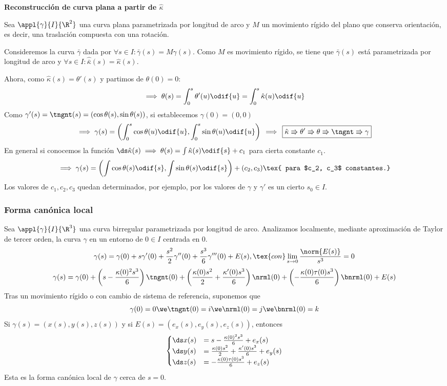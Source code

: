 \textbf{Reconstrucción de curva plana a partir de $\hat{\kappa}$}

Sea $\appl{\gamma}{I}{\R^2}$ una curva plana parametrizada por longitud de arco y $M$ un movimiento rígido del plano que conserva orientación, es decir, una traslación compuesta con una rotación.

Consideremos la curva $\bar{\gamma}$ dada por $\forall s \in I : \bar{\gamma}(s)=M\gamma(s)$. Como $M$ es movimiento rígido, se tiene que $\bar{\gamma}(s)$ está parametrizada por longitud de arco y $\forall s \in I : \hat{\bar{\kappa}}(s)=\hat{\kappa}(s)$.

Ahora, como $\hat{\kappa}(s)=\theta'(s)$ y partimos de $\theta(0)=0$:
\[\implies \theta(s)=\int_{0}^{s}\theta'(u)\odif{u} = \int_0^s\hat{\kappa}(u) \odif{u}\] 
Como $\gamma'(s)=\tngnt(s)=(\cos{\theta(s)}, \sin{\theta(s)})$, si establecemos $\gamma(0)=(0, 0)$
\[\implies\gamma(s)=\left(\int_0^s\cos{\theta(u)} \odif{u},\int_0^s\sin{\theta(u)} \odif{u}\right) \, \implies \, \boxed{\hat{\kappa} \Rrightarrow \theta' \Rrightarrow \theta \Rrightarrow \tngnt \Rrightarrow \gamma}\]
En general si conocemos la función $\ds \hat{\kappa}(s) \implies \theta(s) = \int \hat{\kappa}(s)\odif{s} + c_1$ para cierta constante $c_1$.
\[\implies \gamma(s)=\left(\int \cos{\theta(s)} \odif{s}, \int \sin{\theta(s)}\odif{s}\right) + (c_2, c_3) \tex{ para $c_2, c_3$ constantes.}\]
Los valores de $c_1, c_2, c_3$ quedan determinados, por ejemplo, por los valores de $\gamma$ y $\gamma'$ es un cierto $s_0\in I$.

\subsubsection{Forma canónica local}

Sea $\appl{\gamma}{I}{\R^3}$ una curva birregular parametrizada por longitud de arco.
Analizamos localmente, mediante aproximación de Taylor de tercer orden, la curva $\gamma$ en un entorno de $0 \in I$ centrada en $0$.
\[\gamma(s)=\gamma(0) + s\gamma'(0) + \frac{s^2}{2} \gamma''(0) + \frac{s^3}{6}\gamma'''(0) + E(s), \tex{ con }\lim_{s\to0}\frac{\norm{E(s)}}{s^3} = 0\]
\[\gamma(s)=\gamma(0) + \left(s-\frac{\kappa(0)^2s^3}{6}\right)\tngnt(0) + \left(\frac{\kappa(0)s^2}{2} + \frac{\kappa'(0)s^3}{6}\right)\nrml(0) + \left(-\frac{\kappa(0)\tau(0)s^3}{6}\right)\bnrml(0) + E(s)\]
Tras un movimiento rígido o con cambio de sistema de referencia, suponemos que
\[\gamma(0)=0 \we \tngnt(0)=i \we \nrml(0)=j \we \bnrml(0)=k\]
Si $\gamma(s)=(x(s), y(s), z(s))$ y si $E(s)=(e_x(s), e_y(s), e_z(s))$, entonces
\[\begin{cases}
	\ds x(s) &= s - \frac{\kappa(0)^2s^3}{6} + e_x(s) \\
	\ds y(s) &= \frac{\kappa(0)s^2}{2} + \frac{\kappa'(0)s^3}{6} + e_y(s) \\
	\ds z(s) &= -\frac{\kappa(0)\tau(0)s^3}{6} + e_z(s)
\end{cases}\]
Esta es la forma canónica local de $\gamma$ cerca de $s=0$.

